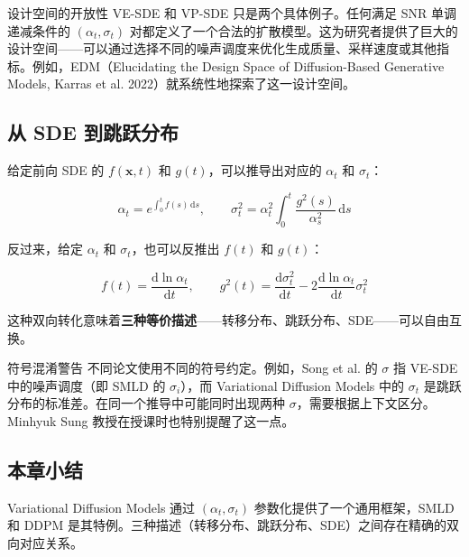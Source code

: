 \begin{knowledgebox}{设计空间的开放性}
VE-SDE 和 VP-SDE 只是两个具体例子。任何满足 SNR 单调递减条件的 $(\alpha_t, \sigma_t)$ 对都定义了一个合法的扩散模型。这为研究者提供了巨大的设计空间——可以通过选择不同的噪声调度来优化生成质量、采样速度或其他指标。例如，EDM（Elucidating the Design Space of Diffusion-Based Generative Models, Karras et al. 2022）就系统性地探索了这一设计空间。
\end{knowledgebox}

\subsection{从 SDE 到跳跃分布}

给定前向 SDE 的 $f(\mathbf{x}, t)$ 和 $g(t)$，可以推导出对应的 $\alpha_t$ 和 $\sigma_t$：

$$
\alpha_t = e^{\int_0^t f(s)\,\mathrm{d}s}, \qquad \sigma_t^2 = \alpha_t^2 \int_0^t \frac{g^2(s)}{\alpha_s^2}\,\mathrm{d}s
$$

反过来，给定 $\alpha_t$ 和 $\sigma_t$，也可以反推出 $f(t)$ 和 $g(t)$：

$$
f(t) = \frac{\mathrm{d} \ln \alpha_t}{\mathrm{d}t}, \qquad g^2(t) = \frac{\mathrm{d}\sigma_t^2}{\mathrm{d}t} - 2\frac{\mathrm{d}\ln \alpha_t}{\mathrm{d}t}\sigma_t^2
$$

这种双向转化意味着\textbf{三种等价描述}——转移分布、跳跃分布、SDE——可以自由互换。

\begin{warningbox}{符号混淆警告}
不同论文使用不同的符号约定。例如，Song et al. 的 $\sigma$ 指 VE-SDE 中的噪声调度（即 SMLD 的 $\sigma_i$），而 Variational Diffusion Models 中的 $\sigma_t$ 是跳跃分布的标准差。在同一个推导中可能同时出现两种 $\sigma$，需要根据上下文区分。Minhyuk Sung 教授在授课时也特别提醒了这一点。
\end{warningbox}

\subsection{本章小结}

Variational Diffusion Models 通过 $(\alpha_t, \sigma_t)$ 参数化提供了一个通用框架，SMLD 和 DDPM 是其特例。三种描述（转移分布、跳跃分布、SDE）之间存在精确的双向对应关系。



